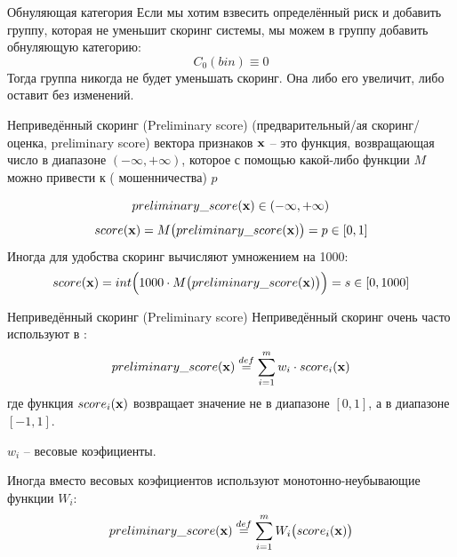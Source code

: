 \begin{frame}{Обнуляющая категория}
	Если мы хотим взвесить определённый риск и добавить группу, которая не уменьшит скоринг системы, 
	мы можем в группу добавить обнуляющую категорию:
	\begin{equation}\label{eq:zero_category}
	C_0 (bin) \equiv 0
	\end{equation}
	Тогда группа никогда не будет уменьшать скоринг. Она либо его увеличит, либо оставит без изменений.
	
	
	
\end{frame}


\begin{frame}{Неприведённый скоринг (Preliminary score)}
	 (предварительный/ая скоринг/оценка, preliminary score)
	вектора признаков $\bold x$ -- это функция, возвращающая число в диапазоне $(- \infty, + \infty)$, которое с помощью 
	какой-либо  функции $M$
	можно привести к  ( мошенничества) $p$
	
	\begin{equation*}
	preliminary\_score(\bold x) \in (- \infty, + \infty)
	\end{equation*}
	\begin{equation}
	score(\bold x) = M \big( preliminary\_score(\bold x) \big) = p \in [0, 1]
	\end{equation}
	Иногда для удобства скоринг вычисляют умножением на 1000:
	\begin{equation}\label{eq:score_preliminary_score}
	score(\bold x) = int \Big( 1000 \cdot M \big( preliminary\_score(\bold x) \big) \Big) = s \in [0, 1000]
	\end{equation}	
\end{frame}

\begin{frame}{Неприведённый скоринг (Preliminary score)}
	Неприведённый скоринг очень часто используют в 
	:
	\begin{equation}
	preliminary\_score(\bold x) \stackrel{def}{=} \sum_{i=1}^{m} w_i \cdot score_i (\bold x)
	\end{equation}
	где функция $score_i (\bold x)$ возвращает значение не в диапазоне $[0, 1]$,
	а в диапазоне $[-1, 1]$.

	$w_i$ -- весовые коэфициенты. 
	
	Иногда вместо весовых коэфициентов используют монотонно-неубывающие функции $W_i$:
	\begin{equation}
	preliminary\_score(\bold x) \stackrel{def}{=} \sum_{i=1}^{m} W_i \big( score_i (\bold x) \big)
	\end{equation}
\end{frame}

